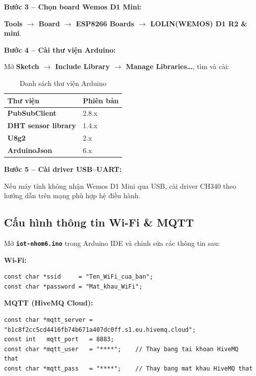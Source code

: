 \documentclass[13pt,a4paper]{article}
\newcommand{\file}[1]{\textbf{\texttt{#1}}}
\begin{document}
\textbf{Bước 3 -- Chọn board Wemos D1 Mini:}

\textbf{Tools $\rightarrow$ Board $\rightarrow$ ESP8266 Boards $\rightarrow$ LOLIN(WEMOS) D1 R2 \& mini}.

\textbf{Bước 4 -- Cài thư viện Arduino:}

Mở \textbf{Sketch $\rightarrow$ Include Library $\rightarrow$ Manage Libraries\ldots}, tìm và cài:

\begin{table}[htbp]
    \centering
    \caption{Danh sách thư viện Arduino}
    \label{tbl:libs}
    \begin{tabular}{|L{5cm}|C{4cm}|}
        \hline
        \textbf{Thư viện} & \textbf{Phiên bản} \\
        \hline
        \textbf{PubSubClient} & 2.8.x \\
        \hline
        \textbf{DHT sensor library} & 1.4.x \\
        \hline
        \textbf{U8g2} & 2.x \\
        \hline
        \textbf{ArduinoJson} & 6.x \\
        \hline
    \end{tabular}
\end{table}

\textbf{Bước 5 -- Cài driver USB--UART:}

Nếu máy tính không nhận Wemos D1 Mini qua USB, cài driver CH340 theo hướng dẫn trên mạng phù hợp hệ điều hành.

\subsection{Cấu hình thông tin Wi-Fi \& MQTT}
\label{sec:config}

Mở \file{iot-nhom6.ino} trong Arduino IDE và chỉnh sửa các thông tin sau:

\textbf{Wi-Fi:}

\begin{lstlisting}[style=cppcode, caption={Cấu hình Wi-Fi trong iot-nhom6.ino}, label={lst:wificfg}]
const char *ssid     = "Ten_WiFi_cua_ban";
const char *password = "Mat_khau_WiFi";
\end{lstlisting}

\textbf{MQTT (HiveMQ Cloud):}

\begin{lstlisting}[style=cppcode, caption={Cấu hình MQTT trong iot-nhom6.ino}, label={lst:mqttcfg}]
const char *mqtt_server = "b1c8f2cc5cd4416fb74b671a407dc0ff.s1.eu.hivemq.cloud";
const int   mqtt_port   = 8883;
const char *mqtt_user   = "****";    // Thay bang tai khoan HiveMQ that
const char *mqtt_pass   = "****";    // Thay bang mat khau HiveMQ that
\end{lstlisting}
\end{document}
